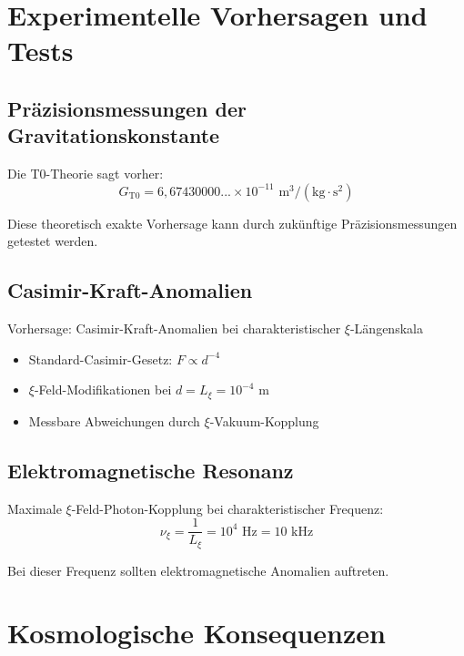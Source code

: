	\section{Experimentelle Vorhersagen und Tests}
	
	\subsection{Präzisionsmessungen der Gravitationskonstante}
	
	Die T0-Theorie sagt vorher:
	\begin{equation}
		G_{\text{T0}} = 6{,}67430000... \times 10^{-11} \text{ m}^3/(\text{kg} \cdot \text{s}^2)
	\end{equation}
	
	Diese theoretisch exakte Vorhersage kann durch zukünftige Präzisionsmessungen getestet werden.
	
	\subsection{Casimir-Kraft-Anomalien}
	
	\begin{experiment}
		Vorhersage: Casimir-Kraft-Anomalien bei charakteristischer $\xi$-Längenskala
		\begin{itemize}
			\item Standard-Casimir-Gesetz: $F \propto d^{-4}$
			\item $\xi$-Feld-Modifikationen bei $d = L_\xi = 10^{-4}$ m
			\item Messbare Abweichungen durch $\xi$-Vakuum-Kopplung
		\end{itemize}
	\end{experiment}
	
	\subsection{Elektromagnetische Resonanz}
	
	Maximale $\xi$-Feld-Photon-Kopplung bei charakteristischer Frequenz:
	\begin{equation}
		\nu_\xi = \frac{1}{L_\xi} = 10^{4} \text{ Hz} = 10 \text{ kHz}
	\end{equation}
	
	Bei dieser Frequenz sollten elektromagnetische Anomalien auftreten.
	
	\section{Kosmologische Konsequenzen}
	
